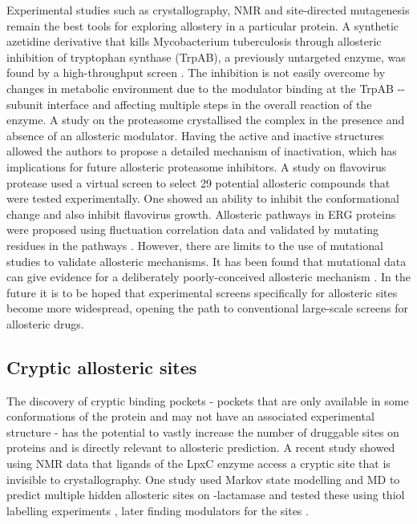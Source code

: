 Experimental studies such as crystallography, NMR and site-directed mutagenesis remain the best tools for exploring allostery in a particular protein.
A synthetic azetidine derivative that kills Mycobacterium tuberculosis through allosteric inhibition of tryptophan synthase (TrpAB), a previously untargeted enzyme, was found by a high-throughput screen \cite{Wellington2017}.
The inhibition is not easily overcome by changes in metabolic environment due to the modulator binding at the TrpAB \textalpha -\textbeta -subunit interface and affecting multiple steps in the overall reaction of the enzyme.
A study on the proteasome \cite{Haselbach2017} crystallised the complex in the presence and absence of an allosteric modulator.
Having the active and inactive structures allowed the authors to propose a detailed mechanism of inactivation, which has implications for future allosteric proteasome inhibitors.
A study on flavovirus protease \cite{Brecher2017} used a virtual screen to select 29 potential allosteric compounds that were tested experimentally.
One showed an ability to inhibit the conformational change and also inhibit flavovirus growth.
Allosteric pathways in ERG proteins were proposed using fluctuation correlation data and validated by mutating residues in the pathways \cite{Ye2017}.
However, there are limits to the use of mutational studies to validate allosteric mechanisms.
It has been found that mutational data can give evidence for a deliberately poorly-conceived allosteric mechanism \cite{Tang2017}.
In the future it is to be hoped that experimental screens specifically for allosteric sites \cite{Martin2012, Jayakar2017, Pellerano2017, Pisco2017, Raman2014} become more widespread, opening the path to conventional large-scale screens for allosteric drugs.


\subsection{Cryptic allosteric sites}

The discovery of cryptic binding pockets - pockets that are only available in some conformations of the protein and may not have an associated experimental structure - has the potential to vastly increase the number of druggable sites on proteins \cite{Boehr2009} and is directly relevant to allosteric prediction.
A recent study \cite{Lee2016} showed using NMR data that ligands of the LpxC enzyme access a cryptic site that is invisible to crystallography.
One study used Markov state modelling and MD to predict multiple hidden allosteric sites on \textbeta -lactamase and tested these using thiol labelling experiments \cite{Bowman2015}, later finding modulators for the sites \cite{Hart2017}.

